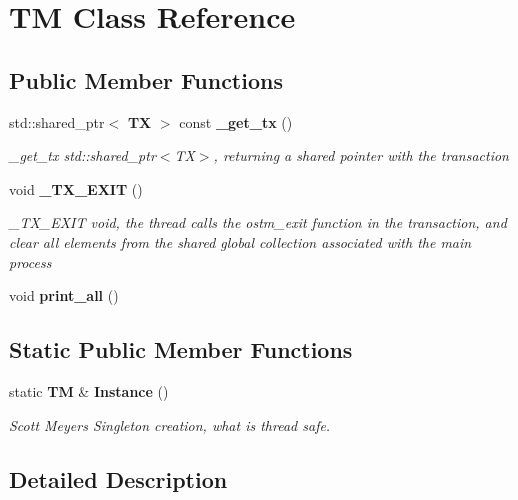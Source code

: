 \section{TM Class Reference}
\label{class_t_m}
\subsection*{Public Member Functions}
\begin{DoxyCompactItemize}
\item 
std\+::shared\+\_\+ptr$<$ {\bf TX} $>$ const {\bf \+\_\+get\+\_\+tx} ()\label{class_t_m_aaca886367344556116a65057018f8827}

\begin{DoxyCompactList}\small\item\em \+\_\+get\+\_\+tx std\+::shared\+\_\+ptr$<$\+T\+X$>$, returning a shared pointer with the transaction \end{DoxyCompactList}\item 
void {\bf \+\_\+\+T\+X\+\_\+\+E\+X\+IT} ()\label{class_t_m_a5e2d1127f2429f2f524d25f430eade06}

\begin{DoxyCompactList}\small\item\em \+\_\+\+T\+X\+\_\+\+E\+X\+IT void, the thread calls the ostm\+\_\+exit function in the transaction, and clear all elements from the shared global collection associated with the main process \end{DoxyCompactList}\item 
void {\bf print\+\_\+all} ()
\end{DoxyCompactItemize}
\subsection*{Static Public Member Functions}
\begin{DoxyCompactItemize}
\item 
static {\bf TM} \& {\bf Instance} ()\label{class_t_m_a1cab95662141550f9bf2771327122075}

\begin{DoxyCompactList}\small\item\em Scott Meyer\textquotesingle{}s Singleton creation, what is thread safe. \end{DoxyCompactList}\end{DoxyCompactItemize}


\subsection{Detailed Description}


